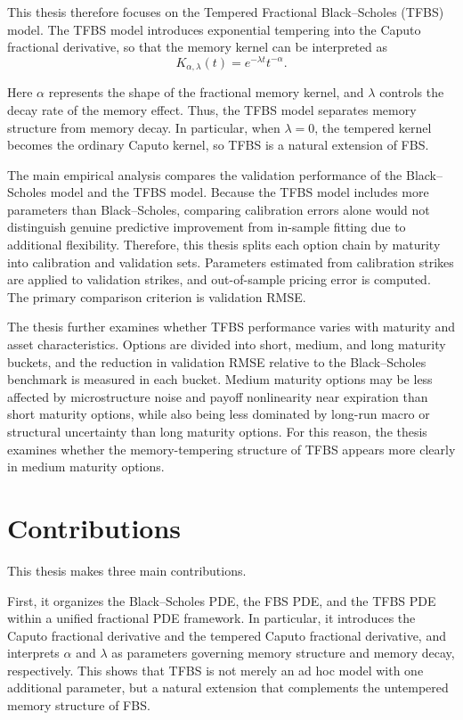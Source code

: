 \documentclass[11pt,a4paper]{report}
\begin{document}
This thesis therefore focuses on the Tempered Fractional Black--Scholes (TFBS) model. The TFBS model introduces exponential tempering into the Caputo fractional derivative, so that the memory kernel can be interpreted as \cite{SabzikarMeerschaertChen2015}
\[
K_{\alpha,\lambda}(t)
=
e^{-\lambda t}t^{-\alpha}.
\]

Here $\alpha$ represents the shape of the fractional memory kernel, and $\lambda$ controls the decay rate of the memory effect. Thus, the TFBS model separates memory structure from memory decay. In particular, when $\lambda=0$, the tempered kernel becomes the ordinary Caputo kernel, so TFBS is a natural extension of FBS.

The main empirical analysis compares the validation performance of the Black--Scholes model and the TFBS model. Because the TFBS model includes more parameters than Black--Scholes, comparing calibration errors alone would not distinguish genuine predictive improvement from in-sample fitting due to additional flexibility. Therefore, this thesis splits each option chain by maturity into calibration and validation sets. Parameters estimated from calibration strikes are applied to validation strikes, and out-of-sample pricing error is computed. The primary comparison criterion is validation RMSE.

The thesis further examines whether TFBS performance varies with maturity and asset characteristics. Options are divided into short, medium, and long maturity buckets, and the reduction in validation RMSE relative to the Black--Scholes benchmark is measured in each bucket. Medium maturity options may be less affected by microstructure noise and payoff nonlinearity near expiration than short maturity options, while also being less dominated by long-run macro or structural uncertainty than long maturity options. For this reason, the thesis examines whether the memory-tempering structure of TFBS appears more clearly in medium maturity options.

\section{Contributions}

This thesis makes three main contributions.

First, it organizes the Black--Scholes PDE, the FBS PDE, and the TFBS PDE within a unified fractional PDE framework. In particular, it introduces the Caputo fractional derivative and the tempered Caputo fractional derivative, and interprets $\alpha$ and $\lambda$ as parameters governing memory structure and memory decay, respectively. This shows that TFBS is not merely an ad hoc model with one additional parameter, but a natural extension that complements the untempered memory structure of FBS.
\end{document}
